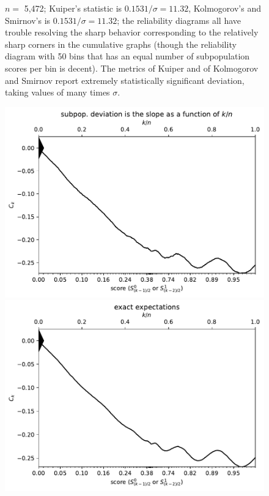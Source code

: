 \documentclass{article}
\newlength{\imsize}
\begin{document}
\begin{figure}
\begin{centering}
\end{centering}
\caption{$n =$ 5,472; Kuiper's statistic is $0.1531 / \sigma = 11.32$,
         Kolmogorov's and Smirnov's is $0.1531 / \sigma = 11.32$;
         the reliability diagrams all have trouble resolving the sharp behavior
         corresponding to the relatively sharp corners in the cumulative graphs
         (though the reliability diagram with 50 bins that has an equal number
         of subpopulation scores per bin is decent).
         The metrics of Kuiper and of Kolmogorov and Smirnov
         report extremely statistically significant deviation,
         taking values of many times $\sigma$.
}
\label{ex1}
\end{figure}


\begin{figure}
\begin{centering}

\parbox{\imsize}{\includegraphics[width=\imsize]
{../codes/unweighted/10000_7000_10_2/cumulative.pdf}}
\quad\quad
\parbox{\imsize}{\includegraphics[width=\imsize]
{../codes/unweighted/10000_7000_10_2/cumulative_exact.pdf}}


\end{centering}
\end{figure}
\end{document}
